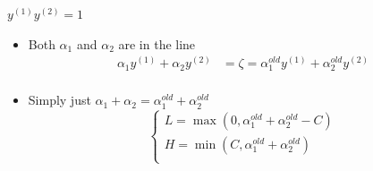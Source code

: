 \documentclass{beamer}
\begin{document}
\begin{frame}{$y^{(1)}y^{(2)} = 1$}
\begin{itemize}
	\item Both $\alpha_1$ and $\alpha_2$ are in the line
	\begin{align*}
	\alpha_1y^{(1)} + \alpha_2y^{(2)} &=\zeta = \alpha_1^{old}y^{(1)} + \alpha_2^{old}y^{(2)} \\
	\end{align*}
	\item Simply just $\alpha_1 + \alpha_2 =\alpha_1^{old} + \alpha_2^{old}$
	\begin{equation}
	\begin{cases}
	L = \max(0, \alpha_1^{old}+\alpha_2^{old}-C)\\
	H = \min(C, \alpha_1^{old}+\alpha_2^{old})\\
	\end{cases}
	\end{equation}
\end{itemize}
\end{frame}
\end{document}
